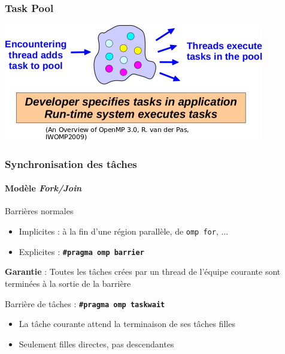 \documentclass{beamer}
\begin{document}

\begin{frame}
  \frametitle{\og Task Pool\fg{}}

  \includegraphics[width=\textwidth]{omp_task_pool.png}
\end{frame}



\begin{frame}
  \frametitle{Synchronisation des tâches}
  \framesubtitle{Modèle \emph{Fork/Join}}
  

  \begin{block}{Barrières \og normales\fg{}}
    \begin{itemize}
    \item Implicites : à la fin d'une région parallèle, de \texttt{omp for}, ...
    \item Explicites : \texttt{\bf \#pragma omp barrier}
    \end{itemize}

    \medskip
    
    \textbf{Garantie} : Toutes les tâches crées par un thread de l'équipe courante sont
    terminées à la sortie de la barrière
  \end{block}
  
  \bigskip
  
  \begin{exampleblock}{Barrière de tâches : \texttt{\bf \#pragma omp taskwait}}
    \begin{itemize}
    \item La tâche courante attend la terminaison de ses tâches \alert{filles}
    \item Seulement filles directes, pas descendantes
    \end{itemize}
  \end{exampleblock}  
\end{frame}
\end{document}
